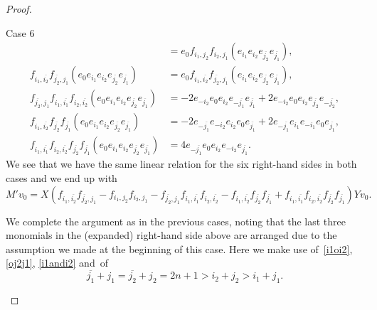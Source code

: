\documentclass[ALCO,ThmDefs,Unicode]{cedram}
\begin{document}
\begin{proof}
\begin{enonce*}[remark]{Case 6}
\begin{align*}
&=e_0f_{i_1,j_2}f_{i_2,j_1}(e_{i_1}e_{i_2}e_{\overline{j_2}}e_{\overline{j_1}}),
\\
f_{i_1,\overline{i_2}}f_{\overline{j_2},j_1}(e_0e_{i_1}e_{i_2}e_{\overline{j_2}}e_{\overline{j_1}})
&=e_0f_{i_1,\overline{i_2}}f_{\overline{j_2},j_1}(e_{i_1}e_{i_2}e_{\overline{j_2}}e_{\overline{j_1}}),
\\
f_{\overline{j_2},j_1}f_{i_1,\overline{i_1}}f_{i_2,\overline{i_2}}(e_0e_{i_1}e_{i_2}e_{\overline{j_2}}e_{\overline{j_1}})
&=-2e_{-i_2}e_{0}e_{i_2}e_{-\overline{j_1}}e_{\overline{j_1}}+2e_{-i_2}e_{0}e_{i_2}e_{\overline{j_2}}e_{-\overline{j_2}},
\\
f_{i_1,\overline{i_2}}f_{\overline{j_2}}f_{\overline{j_1}}(e_0e_{i_1}e_{i_2}e_{\overline{j_2}}e_{\overline{j_1}})
&=-2e_{-\overline{j_1}}e_{-i_2}e_{i_2}e_{0}e_{\overline{j_1}}+2e_{-\overline{j_1}}e_{i_1}e_{-i_1}e_{0}e_{\overline{j_1}},
\\
f_{i_1,\overline{i_1}}f_{i_2,\overline{i_2}}f_{\overline{j_2}}f_{\overline{j_1}}(e_0e_{i_1}e_{i_2}e_{\overline{j_2}}e_{\overline{j_1}})
&=4e_{-\overline{j_1}}e_{0}e_{i_2}e_{-i_2}e_{\overline{j_1}}.
\end{align*}
We see that we have the same linear relation for the six right-hand sides in both cases and we end up with
\[
M'v_0=X(f_{i_1,\overline{i_2}}f_{\overline{j_2},j_1}-f_{i_1,j_2}f_{i_2,j_1}-f_{\overline{j_2},j_1}f_{i_1,\overline{i_1}}f_{i_2,\overline{i_2}}-f_{i_1,\overline{i_2}}f_{\overline{j_2}}f_{\overline{j_1}}+f_{i_1,\overline{i_1}}f_{i_2,\overline{i_2}}f_{\overline{j_2}}f_{\overline{j_1}})Yv_0.
\]

We complete the argument as in the previous cases, noting that the last three monomials in the (expanded) right-hand side above are arranged due to the assumption we made at the beginning of this case. Here we make use of~\eqref{i1oi2}, \eqref{oj2j1}, \eqref{i1andi2} and~of
\begin{equation}\label{oj1andoj2}
\overline{j_1}+j_1=\overline{j_2}+j_2=2n+1>i_2+j_2>i_1+j_1.
\end{equation}


\end{enonce*}
\end{proof}
\end{document}
